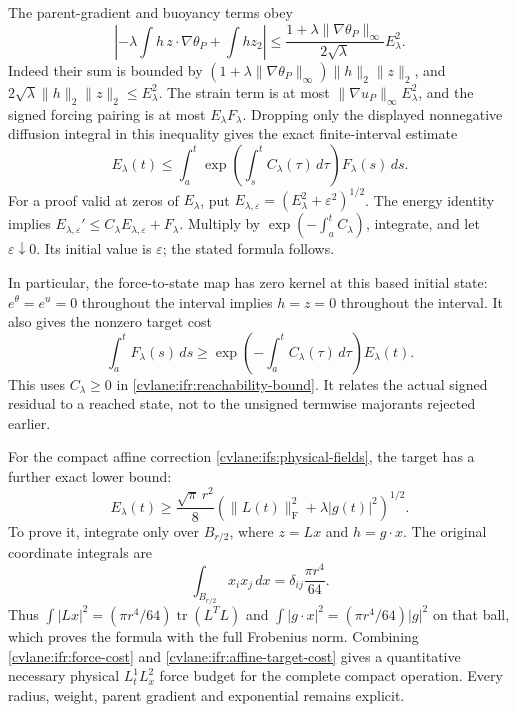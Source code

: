 The parent-gradient and buoyancy terms obey
\[
 \left|-\lambda\int h\,z\cdot\nabla\theta_P+\int h z_2\right|
 \leq\frac{1+\lambda\|\nabla\theta_P\|_\infty}
             {2\sqrt\lambda}E_\lambda^2.
\]
Indeed their sum is bounded by
$(1+\lambda\|\nabla\theta_P\|_\infty)\|h\|_2\|z\|_2$,
and $2\sqrt\lambda\|h\|_2\|z\|_2\leq E_\lambda^2$.
The strain term is at most
$\|\nabla u_P\|_\infty E_\lambda^2$, and the signed forcing
pairing is at most $E_\lambda F_\lambda$.
Dropping only the displayed nonnegative diffusion integral in this
inequality gives the exact finite-interval estimate
\begin{equation}\label{cvlane:ifr:reachability-bound}
 E_\lambda(t)\leq
 \int_a^t
   \exp\!\left(\int_s^t C_\lambda(\tau)\,d\tau\right)
       F_\lambda(s)\,ds .
\end{equation}
For a proof valid at zeros of $E_\lambda$, put
$E_{\lambda,\varepsilon}=(E_\lambda^2+\varepsilon^2)^{1/2}$.
The energy identity implies
$E_{\lambda,\varepsilon}'\leq
C_\lambda E_{\lambda,\varepsilon}+F_\lambda$.
Multiply by $\exp(-\int_a^t C_\lambda)$, integrate, and let
$\varepsilon\downarrow0$.  Its initial value is $\varepsilon$;
the stated formula follows.

In particular, the force-to-state map has zero kernel at this based
initial state: $e^\theta=e^u=0$ throughout the interval implies
$h=z=0$ throughout the interval.  It also gives the nonzero target cost
\begin{equation}\label{cvlane:ifr:force-cost}
 \int_a^t F_\lambda(s)\,ds
 \geq
 \exp\!\left(-\int_a^t C_\lambda(\tau)\,d\tau\right)E_\lambda(t).
\end{equation}
This uses $C_\lambda\geq0$ in \eqref{cvlane:ifr:reachability-bound}.
It relates the actual signed residual to a reached state, not to the
unsigned termwise majorants rejected earlier.

For the compact affine correction \eqref{cvlane:ifs:physical-fields},
the target has a further exact lower bound:
\begin{equation}\label{cvlane:ifr:affine-target-cost}
 E_\lambda(t)\geq
 \frac{\sqrt\pi\,r^2}{8}
 \left(\|L(t)\|_{\mathrm F}^2+\lambda|g(t)|^2\right)^{1/2}.
\end{equation}
To prove it, integrate only over $B_{r/2}$, where
$z=Lx$ and $h=g\cdot x$.  The original coordinate integrals are
\[
 \int_{B_{r/2}}x_i x_j\,dx
    =\delta_{ij}\frac{\pi r^4}{64}.
\]
Thus $\int|Lx|^2=(\pi r^4/64)\operatorname{tr}(L^TL)$
and $\int|g\cdot x|^2=(\pi r^4/64)|g|^2$ on that ball,
which proves the formula with the full Frobenius norm.
Combining \eqref{cvlane:ifr:force-cost} and
\eqref{cvlane:ifr:affine-target-cost} gives a quantitative necessary
physical $L^1_tL^2_x$ force budget for the complete compact operation.
Every radius, weight, parent gradient and exponential remains explicit.

